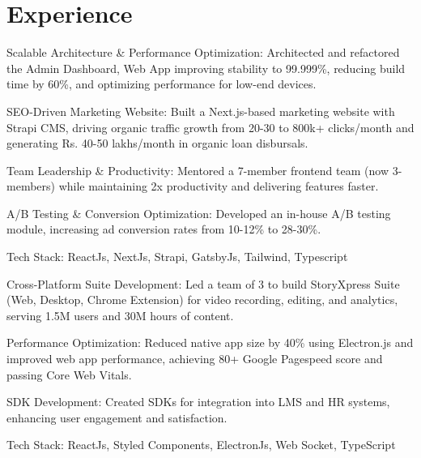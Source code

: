 \documentclass[]{deedy-resume-reversed}
\begin{document}


\begin{minipage}[t]{0.65\textwidth}


\section{Experience}

\hfill
\begin{tightemize}
\item Scalable Architecture \& Performance Optimization: Architected and refactored the Admin Dashboard, Web App improving stability to 99.999\%, reducing build time by 60\%, and optimizing performance for low-end devices.
\item SEO-Driven Marketing Website: Built a Next.js-based marketing website with Strapi CMS, driving organic traffic growth from 20-30 to 800k+ clicks/month and generating Rs. 40-50 lakhs/month in organic loan disbursals.
\item Team Leadership \& Productivity: Mentored a 7-member frontend team (now 3-members) while maintaining 2x productivity and delivering features faster.
\item A/B Testing \& Conversion Optimization: Developed an in-house A/B testing module, increasing ad conversion rates from 10-12\% to 28-30\%.
\item Tech Stack: ReactJs, NextJs, Strapi, GatsbyJs, Tailwind, Typescript
\end{tightemize}
\sectionsep

\begin{tightemize}
\item Cross-Platform Suite Development: Led a team of 3 to build StoryXpress Suite (Web, Desktop, Chrome Extension) for video recording, editing, and analytics, serving 1.5M users and 30M hours of content.
\item Performance Optimization: Reduced native app size by 40\% using Electron.js and improved web app performance, achieving 80+ Google Pagespeed score and passing Core Web Vitals.
\item SDK Development: Created SDKs for integration into LMS and HR systems, enhancing user engagement and satisfaction.
\item Tech Stack: ReactJs, Styled Components, ElectronJs, Web Socket, TypeScript
\end{tightemize}
\sectionsep


\end{minipage}
\end{document}
